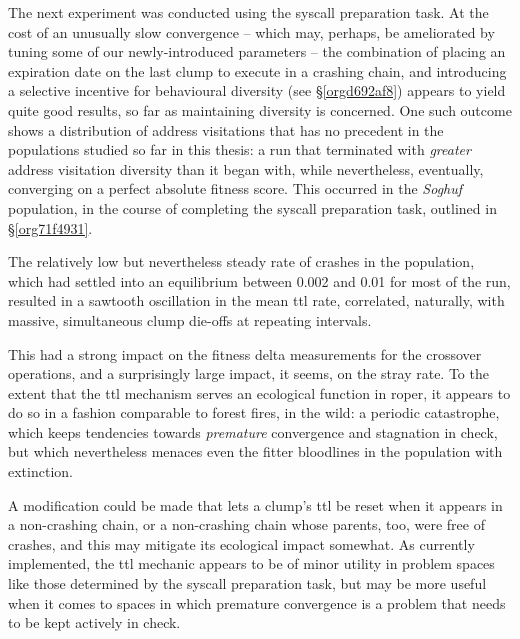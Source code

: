 \documentclass[12pt,glossary]{dalthesis}
\begin{document}
The next experiment was conducted using the syscall preparation task. 
At the cost of an unusually slow convergence -- which may, perhaps, be
ameliorated by tuning some of our newly-introduced parameters -- the combination
of placing an expiration date on the last clump to execute in a crashing chain,
and introducing a selective incentive for behavioural diversity (see \S \ref{orgd692af8}) appears to yield
quite good results, so far as maintaining diversity is concerned. One such outcome
shows a distribution of address visitations that has no precedent in the populations
studied so far in this thesis: a run that terminated with \emph{greater} address visitation
diversity than it began with, while nevertheless, eventually, converging on a perfect
absolute fitness score. This occurred in the \emph{Soghuf} population, in the course of
completing the syscall preparation task, outlined in \S \ref{org71f4931}.

The relatively low but nevertheless
steady rate of crashes in the population, which had settled into an equilibrium between
0.002 and 0.01 for most of the run, resulted in a sawtooth oscillation in the
mean \gls{ttl} rate, correlated, naturally, with massive, simultaneous clump die-offs at
repeating intervals. 

This had a strong impact on the fitness delta measurements for
the crossover operations, and a surprisingly large impact, it seems, on the stray
rate. To the extent that the \gls{ttl} mechanism serves an ecological function in
\gls{roper}, it appears to do so in a fashion comparable to forest fires, in the wild:
a periodic catastrophe, which keeps tendencies towards \emph{premature} convergence and
stagnation in check, but which nevertheless menaces even the fitter bloodlines in
the population with extinction. 

A modification could be made that lets a clump's \gls{ttl} be reset when
it appears in a non-crashing chain, or a non-crashing chain whose parents, too, were
free of crashes, and this may mitigate its ecological
impact somewhat. As currently implemented, the \gls{ttl} mechanic appears to be of
minor utility in problem spaces like those determined by the syscall preparation
task, but may be more useful when it comes to spaces in which premature
convergence is a problem that needs to be kept actively in check.
\end{document}
